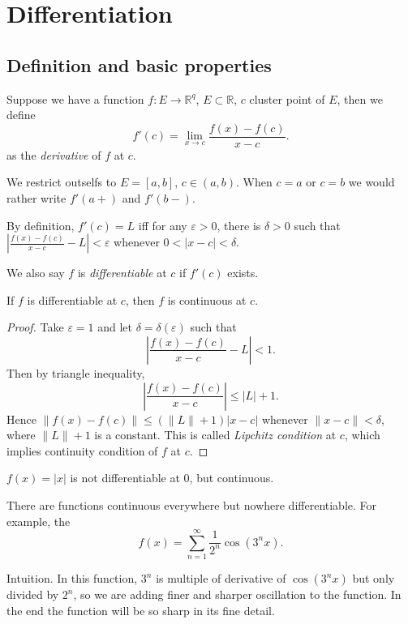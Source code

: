 
\section{Differentiation}
\subsection{Definition and basic properties}
Suppose we have a function $f: E \to \mathbb{R}^q$, $E \subset \mathbb{R}$, $c$ cluster point of $E$, then we define \[
	f'(c) = \lim_{x \to c} \frac{f(x) - f(c)}{x - c}
.\] 
as the \textit{derivative} of $f$ at $c$.

We restrict outselfs to $E = [a,b]$, $c \in (a,b)$. When $c = a$ or $c = b$ we would rather write $f'(a+)$ and $f'(b-)$.

By definition, $f'(c) = L$ iff for any $\varepsilon>0$, there is $\delta>0$ such that $|\frac{f(x)-f(c)}{x - c}-L|<\varepsilon$ whenever $0<|x - c|<\delta$.

We also say $f$ is \textit{differentiable} at $c$ if $f'(c)$ exists.

\begin{proposition}
	If $f$ is differentiable at $c$, then $f$ is continuous at $c$.
\end{proposition}
\begin{proof}
	Take $\varepsilon = 1$ and let $\delta = \delta(\varepsilon)$ such that
	\[
		\left| \frac{f(x) - f(c)}{x -c}- L  \right| < 1
	.\] 
	Then by triangle inequality, 
	 \[
		\left| \frac{f(x) - f(c)}{x - c} \right| \le |L| + 1
	.\] 
	Hence $\|f(x) - f(c)\|\le (\|L\|+1) |x - c|$ whenever $\|x - c\|<\delta$, where $\|L\| + 1$ is a constant. This is called \textit{Lipchitz condition} at $c$, which implies continuity condition of $f$ at $c$.
\end{proof}

\begin{nonexample}
	$f(x) = |x|$ is not differentiable at $0$, but continuous.

	There are functions continuous everywhere but nowhere differentiable. For example, the 
	\[
		f(x) = \sum_{n=1}^{\infty} \frac{1}{2^n}\cos(3^n x)
	.\] 
\begin{intuition}
	Intuition. In this function, $3^n$ is multiple of derivative of $\cos(3^nx)$ but only divided by $2^n$, so we are adding finer and sharper oscillation to the function. In the end the function will be so sharp in its fine detail.
\end{intuition}
\end{nonexample}

